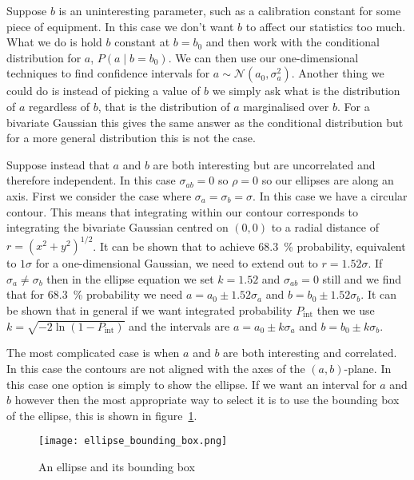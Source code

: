 \documentclass[a4paper]{article}
\newcommand{\st}{\mid}
\newcommand{\distributed}{\sim}
\newcommand{\normal}{\mathcal{N}}
\begin{document}
    Suppose \(b\) is an uninteresting parameter, such as a calibration constant for some piece of equipment.
    In this case we don't want \(b\) to affect our statistics too much.
    What we do is hold \(b\) constant at \(b = b_0\) and then work with the conditional distribution for \(a\), \(P(a\st b = b_0)\).
    We can then use our one-dimensional techniques to find confidence intervals for \(a\distributed \normal(a_0, \sigma_a^2)\).
    Another thing we could do is instead of picking a value of \(b\) we simply ask what is the distribution of \(a\) regardless of \(b\), that is the distribution of \(a\) marginalised over \(b\).
    For a bivariate Gaussian this gives the same answer as the conditional distribution but for a more general distribution this is not the case.
    
    Suppose instead that \(a\) and \(b\) are both interesting but are uncorrelated and therefore independent.
    In this case \(\sigma_{ab} = 0\) so \(\rho = 0\) so our ellipses are along an axis.
    First we consider the case where \(\sigma_a = \sigma_b = \sigma\).
    In this case we have a circular contour.
    This means that integrating within our contour corresponds to integrating the bivariate Gaussian centred on \((0, 0)\) to a radial distance of \(r = (x^2 + y^2)^{1/2}\).
    It can be shown that to achieve \SI{68.3}{\percent} probability, equivalent to \(1\sigma\) for a one-dimensional Gaussian, we need to extend out to \(r = 1.52\sigma\).
    If \(\sigma_a\ne\sigma_b\) then in the ellipse equation we set \(k = 1.52\) and \(\sigma_{ab} = 0\) still and we find that for \SI{68.3}{\percent} probability we need \(a = a_0\pm 1.52\sigma_a\) and \(b = b_0 \pm 1.52\sigma_b\).
    It can be shown that in general if we want integrated probability \(P_{\text{int}}\) then we use \(k = \sqrt{-2\ln(1 - P_{\text{int}})}\) and the intervals are \(a = a_0 \pm k\sigma_a\) and \(b = b_0 \pm k\sigma_b\).
    
    The most complicated case is when \(a\) and \(b\) are both interesting and correlated.
    In this case the contours are not aligned with the axes of the \((a, b)\)-plane.
    In this case one option is simply to show the ellipse.
    If we want an interval for \(a\) and \(b\) however then the most appropriate way to select it is to use the bounding box of the ellipse, this is shown in figure~\ref{fig:ellipse bounding box}.
    \begin{figure}[ht]
        \centering
        \texttt{[image: ellipse\_bounding\_box.png]}
        \caption{An ellipse and its bounding box}
        \label{fig:ellipse bounding box}
    \end{figure}
    
\end{document}
